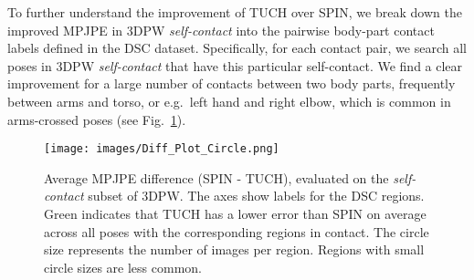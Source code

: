 \documentclass[final]{cvpr}
\theoremstyle{definition}
\begin{document}
\begin{table}[t]
	\centering
	\caption{Evaluation of TUCH for contact classes in 3DPW. Numbers are in \emph{mm}. See text.
}
	\label{tab:results_3DPW_split}
\end{table}
To further understand the improvement of TUCH over SPIN, we break down the improved MPJPE in 3DPW \textit{self-contact} into the pairwise body-part contact labels defined in the DSC dataset.
Specifically, for each contact pair, we search all poses in 3DPW \textit{self-contact} that have this particular self-contact. We find a clear improvement for a large number of contacts between two body parts, frequently between arms and torso, or e.g.~left hand and right elbow, which is common in arms-crossed poses (see Fig.~\ref{fig:MPJPE_Diff}).

 \begin{figure}
\centerline{	
	\texttt{[image: images/Diff\_Plot\_Circle.png]}}
	\caption{Average MPJPE difference (SPIN - TUCH), evaluated on the \textit{self-contact} subset of 3DPW. The axes show labels for the  DSC regions. Green indicates that TUCH has a lower error than SPIN on average across all poses with the corresponding regions in contact. The circle size represents the number of images per region. Regions with small circle sizes are less common.}
	\label{fig:MPJPE_Diff}
\end{figure}
\end{document}
